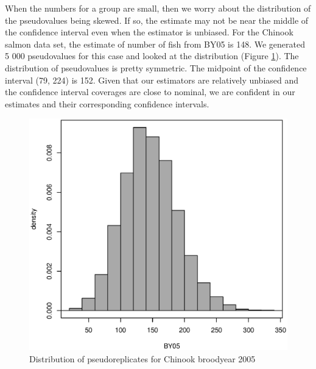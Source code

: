 \documentclass[%
                leqno,         %
%
]{nrc1}                          %
\begin{document}
When the numbers for a group are small, then we worry about the distribution of the pseudovalues being skewed. If so, the estimate may not be near the middle of the confidence interval even when the estimator is unbiased. For the Chinook salmon data set, the estimate of number of fish from BY05 is 148. We generated 5 000 pseudovalues for this case  and looked at the distribution (Figure \ref{fig:CH11BY05}). The distribution of pseudovalues is pretty symmetric. The midpoint of the confidence interval (79, 224) is 152. Given that our estimators are relatively unbiased and the confidence interval coverages are close to nominal, we are confident in our estimates and their corresponding confidence intervals.

\begin{figure}[htbp]
\centering
\includegraphics[width=\textwidth]{./CH11BY05}
\caption{Distribution of pseudoreplicates for Chinook broodyear 2005}
\label{fig:CH11BY05}
\end{figure}
\end{document}
